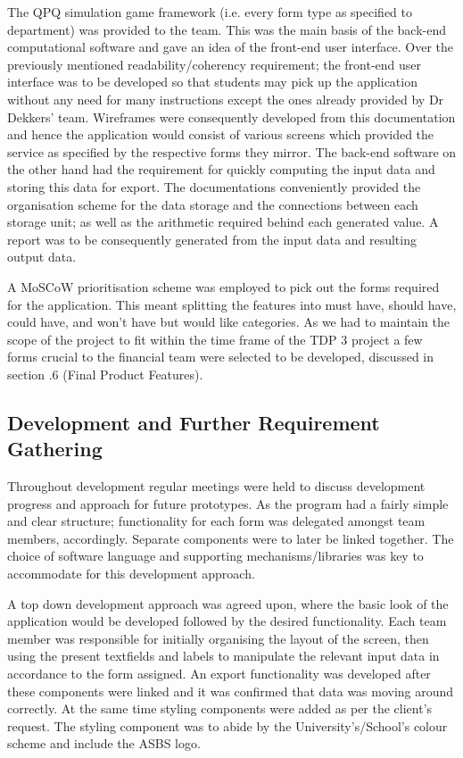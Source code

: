 \documentclass{l3proj}
\begin{document}
The QPQ simulation game framework (i.e. every form type as specified to department) was provided to the team. This was the main basis of the back-end computational software and gave an idea of the front-end user interface. Over the previously mentioned readability/coherency requirement; the front-end user interface was to be developed so that students may pick up the application without any need for many instructions except the ones already provided by Dr Dekkers’ team. Wireframes were consequently developed from this documentation and hence the application would consist of various screens which provided the service as specified by the respective forms they mirror. The back-end software on the other hand had the requirement for quickly computing the input data and storing this data for export. The documentations conveniently provided the organisation scheme for the data storage and the connections between each storage unit; as well as the arithmetic required behind each generated value. A report was to be consequently generated from the input data and resulting output data.
    
A MoSCoW prioritisation scheme was employed to pick out the forms required for the application. This meant splitting the features into must have, should have, could have, and won’t have but would like categories. As we had to maintain the scope of the project to fit within the time frame of the TDP 3 project a few forms crucial to the financial team were selected to be developed, discussed in section .6 (Final Product Features).


\subsection{Development and Further Requirement Gathering}
Throughout development regular meetings were held to discuss development progress and approach for future prototypes. As the program had a fairly simple and clear structure; functionality for each form was delegated amongst team members, accordingly. Separate components were to later be linked together. The choice of software language and supporting mechanisms/libraries was key to accommodate for this development approach.

A top down development approach was agreed upon, where the basic look of the application would be developed followed by the desired functionality. Each team member was responsible for initially organising the layout of the screen, then using the present textfields and labels to manipulate the relevant input data in accordance to the form assigned. An export functionality was  developed after these components were linked and it was confirmed that data was moving around correctly. At the same time styling components were added as per the client's request. The styling component was to abide by the University’s/School’s colour scheme and include the ASBS logo.
\end{document}
